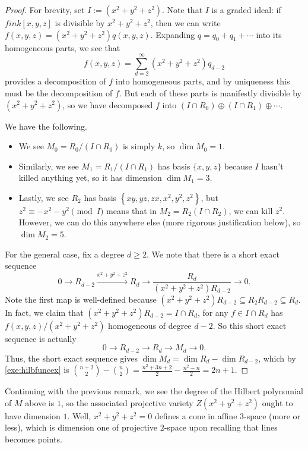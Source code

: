 \begin{proof}
	For brevity, set $I:=\left(x^2+y^2+z^2\right)$. Note that $I$ is a graded ideal: if $fin k[x,y,z]$ is divisible by $x^2+y^2+z^2$, then we can write $f(x,y,z)=\left(x^2+y^2+z^2\right)q(x,y,z)$. Expanding $q=q_0+q_1+\cdots$ into its homogeneous parts, we see that
	\[f(x,y,z)=\sum_{d=2}^\infty\left(x^2+y^2+z^2\right)q_{d-2}\]
	provides a decomposition of $f$ into homogeneous parts, and by uniqueness this must be the decomposition of $f$. But each of these parts is manifestly divisible by $\left(x^2+y^2+z^2\right)$, so we have decomposed $f$ into $(I\cap R_0)\oplus(I\cap R_1)\oplus\cdots$.

	We have the following.
	\begin{itemize}
		\item We see $M_0=R_0/(I\cap R_0)$ is simply $k$, so $\dim M_0=1$.
		\item Similarly, we see $M_1=R_1/(I\cap R_1)$ has basis $\{x,y,z\}$ because $I$ hasn't killed anything yet, so it has dimension $\dim M_1=3$.
		\item Lastly, we see $R_2$ has basis $\left\{xy,yz,zx,x^2,y^2,z^2\right\}$, but $z^2\equiv-x^2-y^2\pmod I$ means that in $M_2=R_2(I\cap R_2)$, we can kill $z^2$. However, we can do this anywhere else (more rigorous justification below), so $\dim M_2=5$.
	\end{itemize}
	For the general case, fix a degree $d\ge2$. We note that there is a short exact sequence
	\[0\to R_{d-2}\stackrel{x^2+y^2+z^2}\to R_d\to\frac{R_d}{\left(x^2+y^2+z^2\right)R_{d-2}}\to0.\]
	Note the first map is well-defined because $\left(x^2+y^2+z^2\right)R_{d-2}\subseteq R_2R_{d-2}\subseteq R_d$. In fact, we claim that $\left(x^2+y^2+z^2\right)R_{d-2}=I\cap R_d$, for any $f\in I\cap R_d$ has $f(x,y,z)/\left(x^2+y^2+z^2\right)$ homogeneous of degree $d-2$. So this short exact sequence is actually
	\[0\to R_{d-2}\to R_d\to M_d\to 0.\]
	Thus, the short exact sequence gives $\dim M_d=\dim R_d-\dim R_{d-2}$, which by \autoref{exe:hilbfuncex} is $\binom{n+2}2-\binom n2=\frac{n^2+3n+2}2-\frac{n^2-n}2=2n+1$.
\end{proof}
\begin{remark}
	Continuing with the previous remark, we see the degree of the Hilbert polynomial of $M$ above is $1$, so the associated projective variety $Z\left(x^2+y^2+z^2\right)$ ought to have dimension $1$. Well, $x^2+y^2+z^2=0$ defines a cone in affine $3$-space (more or less), which is dimension one of projective $2$-space upon recalling that lines becomes points.
\end{remark}
